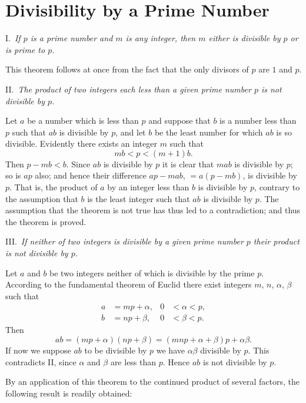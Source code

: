 \documentclass[oneside]{book}
\begin{document}
\section{Divisibility by a Prime Number}\label{s6}

I.~\emph{If $p$ is a prime number and $m$ is any integer, then $m$
either is divisible by $p$ or is prime to $p$.}

This theorem follows at once from the fact that the only divisors of
$p$ are $1$ and $p$.

\smallskip II.~\emph{The product of two integers each less than a
given prime number $p$ is not divisible by $p$.}

Let $a$ be a number which is less than $p$ and suppose that $b$ is a
number less than $p$ such that $ab$ is divisible by $p$, and let $b$
be the least number for which $ab$ is so divisible. Evidently there
exists an integer $m$ such that
\begin{equation*}
mb < p < (m + 1)b.
\end{equation*}
Then $p - mb < b$. Since $ab$ is divisible by $p$ it is clear that
$mab$ is divisible by $p$; so is $ap$ also; and hence their
difference $ap - mab$, $=a(p - mb)$, is divisible by $p$. That is,
the product of $a$ by an integer less than $b$ is divisible by $p$,
contrary to the assumption that $b$ is the least integer such that
$ab$ is divisible by $p$. The assumption that the theorem is not
true has thus led to a contradiction; and thus the theorem is
proved.

\smallskip III.~\emph{If neither of two integers is divisible by a
given prime number $p$ their product is not divisible by $p$.}

Let $a$ and $b$ be two integers neither of which is divisible by the
prime $p$. According to the fundamental theorem of Euclid there
exist integers $m$, $n$, $\alpha$, $\beta$ such that
\begin{align*}
a &= mp + \alpha,& 0 &< \alpha < p, \\
b &= np + \beta, & 0 &< \beta < p.
\end{align*}
Then
\begin{equation*}
ab = (mp  + \alpha)(np + \beta)
   = (mnp + \alpha + \beta)p + \alpha\beta.
\end{equation*}
If now we suppose $ab$ to be divisible by $p$ we have $\alpha\beta$
divisible by $p$. This contradicts II, since $\alpha$ and $\beta$
are less than $p$. Hence $ab$ is not divisible by $p$.

By an application of this theorem to the continued product of
several factors, the following result is readily obtained:
\end{document}
